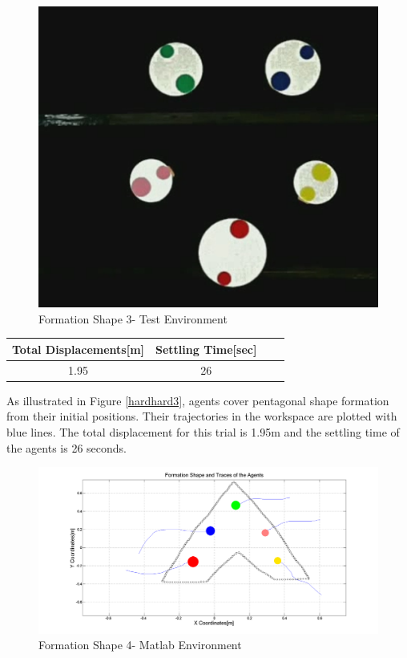 \begin{figure}[H]
\caption{Formation Shape 3- Test Environment}
\centerline{\includegraphics[scale = 0.35]{5_real_hardware}}
\end{figure} 
					
\begin{center}
 \label{hardwareshape3_ref} 
\begin{tabular}{||c| c |c |c ||}
\hline
\textbf{Total Displacements[m]}  & \textbf{Settling Time[sec]}\\ 
\hline
1.95 & 26 \\
\hline
\end{tabular}
\end{center}
	
As illustrated in Figure \ref{hardhard3}, agents cover pentagonal shape formation from their initial positions. Their trajectories in the workspace are plotted with blue lines. The total displacement for this trial is 1.95m and the settling time of the agents is 26 seconds.	
		
\begin{figure}[H]
\caption{Formation Shape 4- Matlab Environment} \label{hardhard4}
\centerline{\includegraphics[scale = 0.32]{6_hardware}}
\end{figure} 
					
